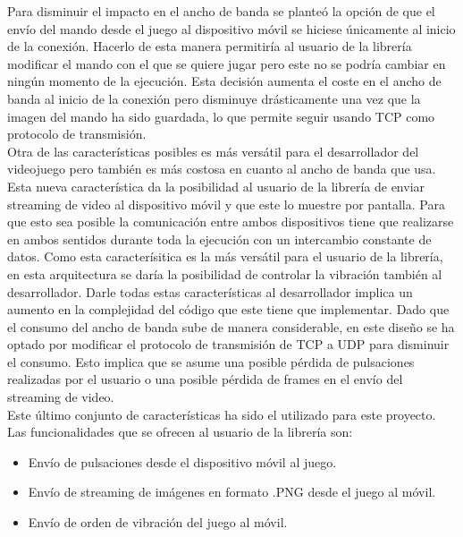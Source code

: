 Para disminuir el impacto en el ancho de banda se plante\'o la opci\'on de que el env\'io del mando desde el juego al dispositivo m\'ovil se hiciese \'unicamente al inicio de la conexi\'on. Hacerlo de esta manera permitir\'ia al usuario de la librer\'ia modificar el mando con el que se quiere jugar pero este no se podr\'ia cambiar en ning\'un momento de la ejecuci\'on. Esta decisi\'on aumenta el coste en el ancho de banda al inicio de la conexi\'on pero disminuye dr\'asticamente una vez que la imagen del mando ha sido guardada, lo que permite seguir usando TCP como protocolo de transmisi\'on.\\


Otra de las caracter\'isticas posibles es m\'as vers\'atil para el desarrollador del videojuego pero tambi\'en es m\'as costosa en cuanto al ancho de banda que usa. Esta nueva caracter\'istica da la posibilidad al usuario de la librer\'ia de enviar streaming de video al dispositivo m\'ovil y que este lo muestre por pantalla. Para que esto sea posible la comunicaci\'on entre ambos dispositivos tiene que realizarse en ambos sentidos durante toda la ejecuci\'on con un intercambio constante de datos. Como esta caracter\'isitica es la m\'as vers\'atil para el usuario de la librer\'ia, en esta arquitectura se dar\'ia la posibilidad de controlar la vibraci\'on tambi\'en al desarrollador. Darle todas estas caracter\'isticas al desarrollador implica un aumento en la complejidad del c\'odigo que este tiene que implementar. Dado que el consumo del ancho de banda sube de manera considerable, en este dise\~no se ha optado por modificar el protocolo de transmisi\'on de TCP a UDP para disminuir el consumo. Esto implica que se asume una posible p\'erdida de pulsaciones realizadas por el usuario o una posible p\'erdida de frames en el env\'io del streaming de video.\\

Este \'ultimo conjunto de caracter\'isticas ha sido el utilizado para este proyecto. Las funcionalidades que se ofrecen al usuario de la librer\'ia son:

\begin {itemize}
\item Env\'io de pulsaciones desde el dispositivo m\'ovil al juego.
\item Env\'io de streaming de im\'agenes en formato .PNG desde el juego al m\'ovil.
\item Env\'io de orden de vibraci\'on del juego al m\'ovil.
\end {itemize}

